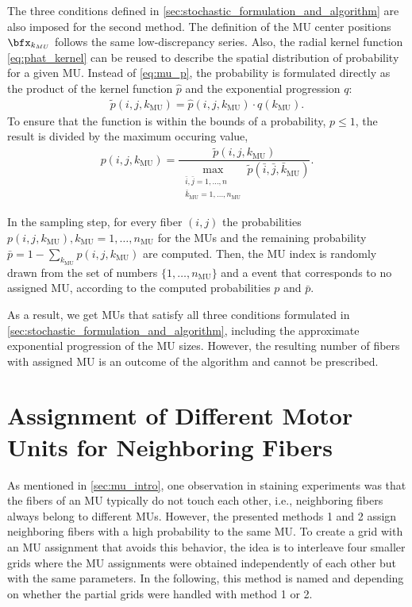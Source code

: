 The three conditions defined in \cref{sec:stochastic_formulation_and_algorithm} are also imposed for the second method. The definition of the MU center positions $\bfx_{k_{MU}}$ follows the same low-discrepancy series. Also, the radial kernel function \cref{eq:phat_kernel} can be reused to describe the spatial distribution of probability for a given MU. Instead of \cref{eq:mu_p}, the probability is formulated directly as the product of the kernel function $\hat{p}$ and the exponential progression $q$:
\begin{align*}
  \tilde{p}(i,j,k_\text{MU}) = \hat{p}(i,j,k_\text{MU}) \cdot q(k_\text{MU}).
\end{align*}
%
To ensure that the function is within the bounds of a probability, $p \leq 1$, the result is divided by the maximum occuring value,%
\begin{align*}
  p(i,j,k_\text{MU}) = \dfrac{\tilde{p}(i,j,k_\text{MU})}{\max\limits_{\substack{\bar{i},\bar{j} = 1,\dots,n\\\bar{k}_\text{MU}=1,\dots,n_\text{MU}}} \tilde{p}(\bar{i},\bar{j},\bar{k}_\text{MU})}.
\end{align*}
%

In the sampling step, for every fiber $(i,j)$ the probabilities $p(i,j,k_\text{MU}), k_\text{MU}=1,\dots,n_\text{MU}$ for the MUs and the remaining probability $\bar{p} = 1-\sum_{k_\text{MU}} p(i,j,k_\text{MU})$ are computed. Then, the MU index is randomly drawn from the set of numbers $\{1,\dots,n_\text{MU}\}$ and a  event that corresponds to no assigned MU, according to the computed probabilities $p$ and $\bar{p}$. 

As a result, we get MUs that satisfy all three conditions formulated in \cref{sec:stochastic_formulation_and_algorithm}, including the approximate exponential progression of the MU sizes. However, the resulting number of fibers with assigned MU is an outcome of the algorithm and cannot be prescribed.

\section{Assignment of Different Motor Units for Neighboring Fibers}\label{sec:method3_modification}

As mentioned in \cref{sec:mu_intro}, one observation in staining experiments was that the fibers of an MU typically do not touch each other, i.e., neighboring fibers always belong to different MUs.
However, the presented methods 1 and 2 assign neighboring fibers with a high probability to the same MU. To create a grid with an MU assignment that avoids this behavior, the idea is to interleave four smaller grids where the MU assignments were obtained independently of each other but with the same parameters. In the following, this method is named  and  depending on whether the partial grids were handled with method 1 or 2.

